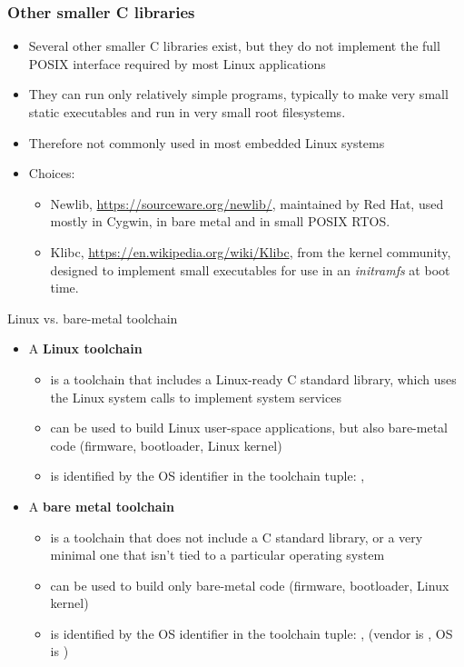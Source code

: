 \begin{frame}
  \frametitle{Other smaller C libraries}
  \begin{itemize}
  \item Several other smaller C libraries exist, but they do not
        implement the full POSIX interface required by most Linux
        applications
  \item They can run only relatively simple programs, typically to
        make very small static executables and run in very small root
        filesystems.
  \item Therefore not commonly used in most embedded Linux systems
  \item Choices:
    \begin{itemize}
    \item Newlib, \url{https://sourceware.org/newlib/}, maintained by
          Red Hat, used mostly in Cygwin, in bare metal and in small POSIX RTOS.
    \item Klibc, \url{https://en.wikipedia.org/wiki/Klibc}, from the
          kernel community, designed to implement small executables for
          use in an {\em initramfs} at boot time.
    \end{itemize}
  \end{itemize}
\end{frame}

\begin{frame}{Linux vs. bare-metal toolchain}
  \begin{itemize}
  \item A {\bf Linux toolchain}
    \begin{itemize}
    \item is a toolchain that includes a Linux-ready C standard library, which
          uses the Linux system calls to implement system services
    \item can be used to build Linux user-space applications, but also
          bare-metal code (firmware, bootloader, Linux kernel)
    \item is identified by the  OS identifier in the
          toolchain tuple: , 
    \end{itemize}
  \item A {\bf bare metal toolchain}
    \begin{itemize}
    \item is a toolchain that does not include a C standard library, or a very
          minimal one that isn't tied to a particular operating system
    \item can be used to build only bare-metal code (firmware,
          bootloader, Linux kernel)
    \item is identified by the  OS identifier in the
          toolchain tuple: , 
          (vendor is , OS is )
    \end{itemize}
  \end{itemize}
\end{frame}


